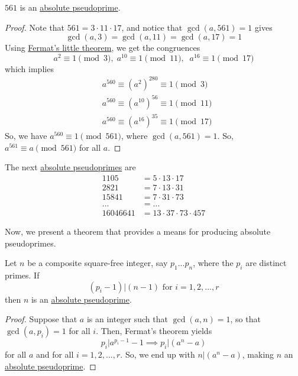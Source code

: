\documentclass{article}
\newcounter{theorem}[section]
\begin{document}
\begin{lemma}
  \label{thm:561-is-an-absolute-pseudoprime}
$561$ is an \hyperref[def:absolute-pseudoprime]{absolute pseudoprime}. 
\end{lemma}
\begin{proof}
Note that $561 = 3 \cdot 11 \cdot 17$, and notice that $\gcd(a, 561) = 1$ gives 
\begin{equation}
  \gcd(a, 3) = \gcd(a, 11) = \gcd(a, 17) = 1
\end{equation}
Using \hyperref[thm:fermats-little-theorem]{Fermat's little theorem}, we get the congruences
\begin{equation}
  a^2 \equiv 1 \pmod{3}, \; a^{10} \equiv 1 \pmod{11}, \;\; a^{16} \equiv 1 \pmod{17}
\end{equation}
which implies 
\begin{align*}
    &a^{560} \equiv (a^2)^{280} \equiv 1 \pmod{3} \\
    &a^{560} \equiv (a^{10})^{56} \equiv 1 \pmod{11} \\
    &a^{560} \equiv (a^{16})^{35} \equiv 1 \pmod{17} 
\end{align*}
So, we have $a^{560} \equiv 1 \pmod{561}$, where $\gcd(a, 561) =1$. So, $a^{561} \equiv a \pmod{561}$ for all $a$. 
\end{proof}

The next \hyperref[def:absolute-pseudoprime]{absolute pseudoprimes} are 
\begin{align*}
    1105 & = 5 \cdot 13 \cdot 17 \\
    2821 & = 7 \cdot 13 \cdot 31 \\
    15841 & = 7 \cdot 31 \cdot 73 \\
    ... & = ... \\
    16046641 & = 13 \cdot 37 \cdot 73 \cdot 457
\end{align*}

Now, we present a theorem that provides a means for producing absolute pseudoprimes. 

\begin{theorem}
  \label{thm:criterion-for-a-square-free-absolute-pseudoprime}
Let $n$ be a composite square-free integer, say $p_1... p_n$, where the $p_i$ are distinct primes. If 
\begin{equation}
  (p_i - 1) \big| (n-1) \text{ for } i = 1, 2, ..., r
\end{equation}
then $n$ is an \hyperref[def:absolute-pseudoprime]{absolute pseudoprime}. 
\end{theorem}
\begin{proof}
Suppose that $a$ is an integer such that $\gcd(a, n) = 1$, so that $\gcd(a, p_i) = 1$ for all $i$. Then, Fermat's theorem yields
\begin{equation}
  p_i \big| a^{p_i - 1} - 1 \implies p_i \big| (a^n - a)
\end{equation}
for all $a$ and for all $i = 1, 2, ..., r$. So, we end up with $n \big| (a^n - a)$, making $n$ an \hyperref[def:absolute-pseudoprime]{absolute pseudoprime}. 
\end{proof}
\end{document}
